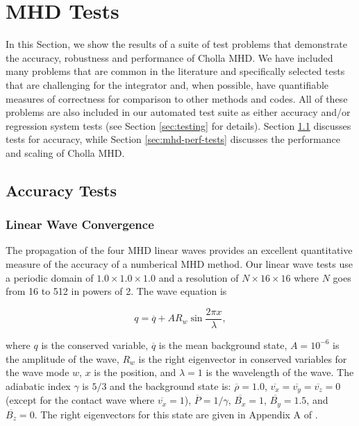 \documentclass[modern, linenumbers]{aastex631}
\begin{document}
\section{MHD Tests}
\label{sec:mhd-tests}

In this Section, we show the results of a suite of test problems that demonstrate the accuracy, robustness and performance of Cholla MHD. We have included many problems that are common in the literature and specifically selected tests that are challenging for the integrator and, when possible, have quantifiable measures of correctness for comparison to other methods and codes. All of these problems are also included in our automated test suite as either accuracy and/or regression system tests (see Section \ref{sec:testing} for details). Section \ref{sec:accuracy_tests} discusses tests for accuracy, while Section \ref{sec:mhd-perf-tests} discusses the performance and scaling of Cholla MHD.

\subsection{Accuracy Tests}
\label{sec:accuracy_tests}

\subsubsection{Linear Wave Convergence}
\label{sec:lwc}

The propagation of the four MHD linear waves provides an excellent quantitative measure of the accuracy of a numberical MHD method. Our linear wave tests use a periodic domain of $1.0\times1.0\times1.0$ and a resolution of $N\times16\times16$ where $N$ goes from 16 to 512 in powers of 2. The wave equation is

\begin{equation}
    q = \overline{q} + A R_w \sin{\frac{2\pi x}{\lambda}},
\end{equation}

\noindent where $q$ is the conserved variable, $\overline{q}$ is the mean background state, $A=10^{-6}$ is the amplitude of the wave, $R_w$ is the right eigenvector in conserved variables for the wave mode $w$, $x$ is the position, and $\lambda=1$ is the wavelength of the wave. The adiabatic index $\gamma$ is $5/3$ and the background state is:
$\overline{\rho}=1.0$,
$\overline{v_x}=\overline{v_y}=\overline{v_z}=0$ (except for the contact wave where $\overline{v_x} = 1$),
$\overline{P}=1/\gamma$,
$\overline{B_x}=1$,
$\overline{B_y}=1.5$,
and $\overline{B_z}=0$.
The right eigenvectors for this state are given in Appendix A of \cite{gardiner_unsplit_2008}.
\end{document}
